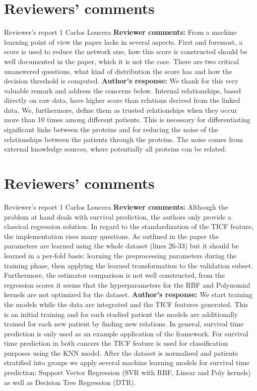 \documentclass{bmcart}
\begin{document}
\begin{backmatter}
\section*{Reviewers' comments}
\newline Reviewer's report 1
\newline Carlos Loucera
\newline \textbf{Reviewer comments:}
From a machine learning point of view the paper lacks in several aspects. First and foremost, a score is used to reduce the network size, how this score is constructed should be well documented in the paper, which it is not the case. There are two critical unanswered questions, what kind of distribution the score has and how the decision threshold is computed.
\newline \textbf{Author's response:}
We thank for this very valuable remark and address the concerns below.
Internal relationships, based directly on raw data, have higher score than relations derived from the linked data. We, furthermore, define them as trusted relationships when they occur more than 10 times among different patients. This is necessary for differentiating significant links between the proteins and for reducing the noise of the relationships between the patients through the proteins. The noise comes from external knowledge sources, where potentially all proteins can be related.

\section*{Reviewers' comments}
\newline Reviewer's report 1
\newline Carlos Loucera
\newline \textbf{Reviewer comments:}
Although the problem at hand deals with survival prediction, the authors only provide a classical regression solution. 
In regard to the standardization of the TICF feature, the implementation rises many questions. As outlined in the paper the parameters are learned using the whole dataset (lines 26-33) but it should be learned in a per-fold basis: learning the preprocessing parameters during the training phase, then applying the learned transformation to the validation subset.
Furthermore, the estimator comparison is not well constructed, from the regression scores it seems that the hyperparameters for the RBF and Polynomial kernels are not optimized for the dataset.
\newline \textbf{Author's response:}
We start training the models while the data are integrated and the TICF features generated. This is an initial training and for each studied patient the models are additionally trained for each new patient by finding new relations.
In general, survival time prediction is only used as an example application of the framework. For survival time prediction in both cancers the TICF feature is used for classification purposes using the KNN model.
After the dataset is normalised and patients stratified into groups we apply several machine learning models for survival time prediction: Support  Vector Regression (SVR with RBF, Linear and Poly kernels) as well as Decision Tree Regression (DTR).



\end{backmatter}
\end{document}
